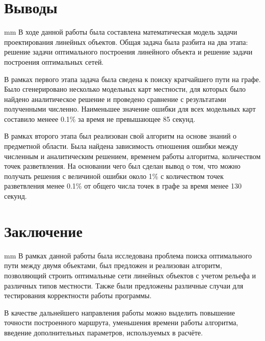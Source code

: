 \newpage
\section*{\LARGE{Выводы}}
 mm
В ходе данной работы была составлена математическая модель задачи проектирования линейных объектов. Общая задача была разбита на два этапа: решение задачи оптимального построения линейного объекта и решение задачи построения оптимальных сетей.
\par
В рамках первого этапа задача была сведена к поиску кратчайшего пути на графе. Было сгенерировано несколько модельных карт местности, для которых было найдено аналитическое решение и проведено сравнение с результатами полученными численно. Наименьшее значение ошибки для всех модельных карт составило менеее 0.1\% за время не превышающее 85 секунд.
\par
В рамках второго этапа был реализован свой алгоритм на основе знаний о предметной области. Была найдена зависимость отношения ошибки между численным и аналитическим решением, временем работы алгоритма, количеством точек разветвления. На основании чего был сделан вывод о том, что можно получать решения с величиной ошибки около 1\% с количеством точек разветвления менее 0.1\% от общего числа точек в графе за время менее 130 секунд.
\newpage
\section*{\LARGE\bf{Заключение}}
 mm
В рамках данной работы была исследована проблема поиска оптимального пути между двумя объектами, был предложен и реализован алгоритм, позволяющий строить оптимальные сети линейных объектов с учетом рельефа и различных типов местности. Также были предложены различные случаи для тестирования корректности работы программы.
\par
В качестве дальнейшего направления работы можно выделить повышение точности построенного маршрута, уменьшения времени работы алгоритма, введение дополнительных параметров, используемых в расчёте.
